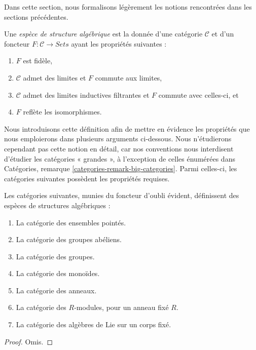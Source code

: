 \noindent
Dans cette section, nous formalisons légèrement les notions rencontrées dans
les sections précédentes.

\begin{definition}
\label{definition-algebraic-structure}
Une {\it espèce de structure algébrique} est la donnée d'une catégorie
$\mathcal{C}$ et d'un foncteur $F : \mathcal{C} \to \textit{Sets}$ ayant les
propriétés suivantes :
\begin{enumerate}
\item $F$ est fidèle,
\item $\mathcal{C}$ admet des limites et $F$ commute aux limites,
\item $\mathcal{C}$ admet des limites inductives filtrantes et $F$ commute avec
celles-ci, et
\item $F$ reflète les isomorphismes.
\end{enumerate}
\end{definition}

\noindent
Nous introduisons cette définition afin de mettre en évidence les propriétés
que nous emploierons dans plusieurs arguments ci-dessous. Nous n'étudierons
cependant pas cette notion en détail, car nos conventions nous interdisent
d'étudier les catégories « grandes », à l'exception de celles énumérées dans
Catégories, remarque \ref{categories-remark-big-categories}.
Parmi celles-ci, les catégories suivantes possèdent les propriétés requises.

\begin{lemma}
\label{lemma-list-algebraic-structures}
Les catégories suivantes, munies du foncteur d'oubli évident, définissent des
espèces de structures algébriques :
\begin{enumerate}
\item La catégorie des ensembles pointés.
\item La catégorie des groupes abéliens.
\item La catégorie des groupes.
\item La catégorie des monoïdes.
\item La catégorie des anneaux.
\item La catégorie des $R$-modules, pour un anneau fixé $R$.
\item La catégorie des algèbres de Lie sur un corps fixé.
\end{enumerate}
\end{lemma}

\begin{proof}
Omis.
\end{proof}

